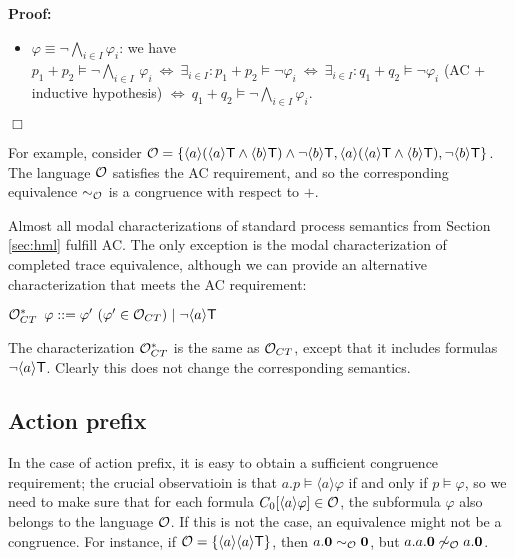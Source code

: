 \documentclass{eptcs}
\def\hmo{{\cal O}}
\def\hmeq{\sim_{\cal O}}
\def\iff{\Leftrightarrow}
\def\true{{\sf T}}
\newenvironment{proof}{\begin{trivlist} \item[\hspace{\labelsep}\bf Proof:]}{\hfill $\Box$ \end{trivlist}}
\newcommand{\diam}[1]{\langle#1\rangle}
\begin{document}
\begin{proof}
\begin{itemize}
\begin{itemize}
\item $\varphi \equiv \neg \bigwedge_{i \in I} \varphi_i$: we have $p_1 + p_2 \models \neg \bigwedge_{i \in I}\, \varphi_i ~\iff~ \exists_{i \in I}: p_1 + p_2 \models \neg \varphi_i ~\iff~ \exists_{i \in I}: q_1 + q_2 \models \neg \varphi_i$ (AC + inductive hypothesis) $ \iff~ q_1 + q_2 \models \neg \bigwedge_{i \in I} \varphi_i  $.
\end{itemize}

\end{itemize}
 
\end{proof} 


For example, consider $\hmo = \{  \diam{a}(\diam{a}\true \wedge \diam{b}\true)  \wedge \neg \diam{b}\true, \diam{a}(\diam{a}\true \wedge \diam{b}\true), \neg \diam{b}\true \}$. The language $\hmo$ satisfies the AC requirement, and so the corresponding equivalence $\hmeq$ is a congruence with respect to $+$. 

\vspace{2mm}

Almost all modal characterizations of standard process semantics from Section \ref{sec:hml} fulfill AC. The only exception is the modal characterization of completed trace equivalence,
although we can provide an alternative characterization that meets the AC requirement:
\begin{center}
$\hmo^\ast_{CT} \hspace{5.0 pt} \varphi ::= \varphi'~(\varphi' \in \hmo_{CT})\hspace{3.0 pt}|\hspace{3.0 pt} \neg \diam{a} \true$ 
\end{center}
The characterization $\hmo^\ast_{CT}$ is the same as $\hmo_{CT}$, except that it includes formulas $\neg \diam{a} \true$. Clearly this does not change the corresponding semantics.
	 

\subsection{Action prefix}

In the case of action prefix, it is easy to obtain a sufficient congruence requirement; the crucial observatioin is that $a.p \models \diam{a} \varphi$ if and only if $p \models \varphi$, so we need to make sure that for each formula $C_0[\diam{a}\varphi] \in \hmo$, the subformula $\varphi$ also belongs to the language $\hmo$. If this is not the case, an equivalence might not be a congruence. For instance, if $\hmo = \{ \diam{a}\diam{a}\true \}$, then $a.{\bf 0} \hmeq {\bf 0}$, but $a.a.{\bf 0} \not\hmeq a.{\bf 0}$.
\end{document}

